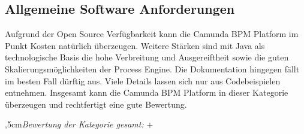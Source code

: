 
\subsection{Allgemeine Software Anforderungen}

Aufgrund der Open Source Verfügbarkeit kann die Camunda BPM Platform im Punkt Kosten natürlich überzeugen. Weitere Stärken sind mit Java als technologische Basis die hohe Verbreitung und Ausgereiftheit sowie die guten Skalierungsmöglichkeiten der Process Engine. Die Dokumentation hingegen fällt im besten Fall dürftig aus. Viele Details lassen sich nur aus Codebeispielen entnehmen. Insgesamt kann die Camunda BPM Platform in dieser Kategorie überzeugen und rechtfertigt eine gute Bewertung.

\bigskip{},5cm\textit{Bewertung der Kategorie gesamt:} \hspace{5mm} \textcircled{+}
\leftskip=0cm

